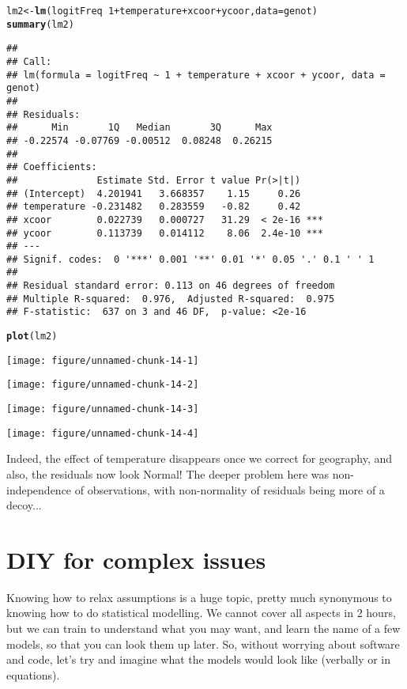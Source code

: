 \documentclass[12pt,a4paper]{scrartcl}\usepackage[]{graphicx}\usepackage[]{color}
\makeatletter
\def\maxwidth{ %
  \ifdim\Gin@nat@width>\linewidth
    \linewidth
  \else
    \Gin@nat@width
  \fi
}
\newcommand{\hlnum}[1]{\textcolor[rgb]{0.686,0.059,0.569}{#1}}%
\newcommand{\hlopt}[1]{\textcolor[rgb]{0,0,0}{#1}}%
\newcommand{\hlstd}[1]{\textcolor[rgb]{0.345,0.345,0.345}{#1}}%
\newcommand{\hlkwb}[1]{\textcolor[rgb]{0.69,0.353,0.396}{#1}}%
\newcommand{\hlkwc}[1]{\textcolor[rgb]{0.333,0.667,0.333}{#1}}%
\newcommand{\hlkwd}[1]{\textcolor[rgb]{0.737,0.353,0.396}{\textbf{#1}}}%
\newenvironment{kframe}{%
 \def\at@end@of@kframe{}%
 \ifinner\ifhmode%
  \def\at@end@of@kframe{\end{minipage}}%
  \begin{minipage}{\columnwidth}%
 \fi\fi%
 \def\FrameCommand##1{\hskip\@totalleftmargin \hskip-\fboxsep
 \colorbox{shadecolor}{##1}\hskip-\fboxsep
     \hskip-\linewidth \hskip-\@totalleftmargin \hskip\columnwidth}%
 \MakeFramed {\advance\hsize-\width
   \@totalleftmargin\z@ \linewidth\hsize
   \@setminipage}}%
 {\par\unskip\endMakeFramed%
 \at@end@of@kframe}
\newenvironment{knitrout}{}{} %
\makeatother
\begin{document}
\begin{Answer}
\begin{knitrout}
\color{fgcolor}\begin{kframe}
\begin{alltt}
\hlstd{lm2} \hlkwb{<-} \hlkwd{lm}\hlstd{(logitFreq} \hlopt{~} \hlnum{1} \hlopt{+} \hlstd{temperature} \hlopt{+} \hlstd{xcoor} \hlopt{+} \hlstd{ycoor,} \hlkwc{data}\hlstd{=genot)}
\hlkwd{summary}\hlstd{(lm2)}
\end{alltt}
\begin{verbatim}
## 
## Call:
## lm(formula = logitFreq ~ 1 + temperature + xcoor + ycoor, data = genot)
## 
## Residuals:
##      Min       1Q   Median       3Q      Max 
## -0.22574 -0.07769 -0.00512  0.08248  0.26215 
## 
## Coefficients:
##              Estimate Std. Error t value Pr(>|t|)    
## (Intercept)  4.201941   3.668357    1.15     0.26    
## temperature -0.231482   0.283559   -0.82     0.42    
## xcoor        0.022739   0.000727   31.29  < 2e-16 ***
## ycoor        0.113739   0.014112    8.06  2.4e-10 ***
## ---
## Signif. codes:  0 '***' 0.001 '**' 0.01 '*' 0.05 '.' 0.1 ' ' 1
## 
## Residual standard error: 0.113 on 46 degrees of freedom
## Multiple R-squared:  0.976,	Adjusted R-squared:  0.975 
## F-statistic:  637 on 3 and 46 DF,  p-value: <2e-16
\end{verbatim}
\begin{alltt}
\hlkwd{plot}\hlstd{(lm2)}
\end{alltt}
\end{kframe}
\texttt{[image: figure/unnamed-chunk-14-1]} 

\texttt{[image: figure/unnamed-chunk-14-2]} 

\texttt{[image: figure/unnamed-chunk-14-3]} 

\texttt{[image: figure/unnamed-chunk-14-4]} 

\end{knitrout}
Indeed, the effect of temperature disappears once we correct for geography, and also, the residuals now look Normal!
The deeper problem here was non-independence of observations, with non-normality of residuals being more of a decoy...
\end{Answer}

\section{DIY for complex issues}
Knowing how to relax assumptions is a huge topic, pretty much synonymous to knowing how to do statistical modelling. 
We cannot cover all aspects in 2 hours, but we can train to understand what you may want, and learn the name of a few models, so that you can look them up later. So, without worrying about software and code, let's try and imagine what the models would look like (verbally or in equations).
\end{document}
